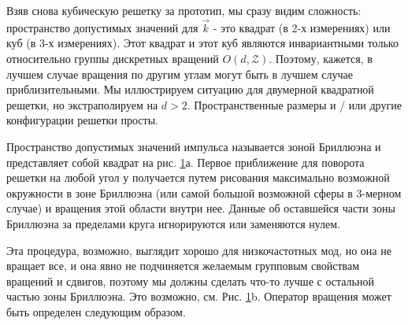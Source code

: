 \documentclass[main.tex]{subfiles}
\begin{document}
Взяв снова кубическую решетку за прототип, мы сразу видим сложность: пространство допустимых значений для $\vec k$ - это квадрат (в 2-х измерениях) или куб (в 3-х измерениях). Этот квадрат и этот куб являются инвариантными только относительно группы дискретных вращений $O(d, \mathcal{Z})$. Поэтому, кажется, в лучшем случае вращения по другим углам могут быть в лучшем случае приблизительными. Мы иллюстрируем ситуацию для двумерной квадратной решетки, но экстраполируем на $d > 2$. Пространственные размеры и / или другие конфигурации решетки просты.

Пространство допустимых значений импульса называется зоной Бриллюэна и представляет собой квадрат на рис. \ref{i18.1}а. Первое приближение для поворота решетки на любой угол у получается путем рисования максимально возможной окружности в зоне Бриллюэна (или самой большой возможной сферы в 3-мерном случае) и вращения этой области внутри нее. Данные об оставшейся части зоны Бриллюэна за пределами круга игнорируются или заменяются нулем.

Эта процедура, возможно, выглядит хорошо для низкочастотных мод, но она не вращает все, и она явно не подчиняется желаемым групповым свойствам вращений и сдвигов, поэтому мы должны сделать что-то лучше с остальной частью зоны Бриллюэна. Это возможно, см. Рис. \ref{i18.1}b. Оператор вращения может быть определен следующим образом.
 
\begin{figure}[ht]
	\begin{center}
		\caption{
		\label{i18.1} }
	\end {center}
\end {figure}
\end{document}
